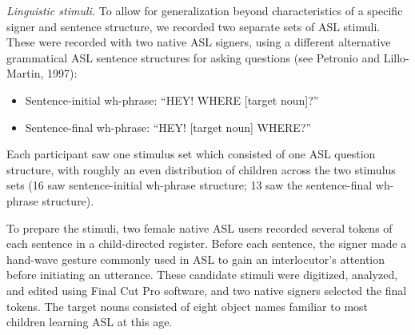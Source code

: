 \documentclass[oneside]{report}
\begin{document}
\emph{Linguistic stimuli.} To allow for generalization beyond
characteristics of a specific signer and sentence structure, we recorded
two separate sets of ASL stimuli. These were recorded with two native
ASL signers, using a different alternative grammatical ASL sentence
structures for asking questions (see Petronio and Lillo-Martin, 1997):
\begin{itemize}
\tightlist
\item
  Sentence-initial wh-phrase: ``HEY! WHERE {[}target noun{]}?''
\item
  Sentence-final wh-phrase: ``HEY! {[}target noun{]} WHERE?''
\end{itemize}
\noindent Each participant saw one stimulus set which consisted of one
ASL question structure, with roughly an even distribution of children
across the two stimulus sets (16 saw sentence-initial wh-phrase
structure; 13 saw the sentence-final wh-phrase structure).
\begin{table}

\caption[Iconicity scores and phonological overlap for ASL stimuli]{\label{tab:sol-asl-lex-table}Iconicity scores (1 = not iconic at all; 7 = very iconic) and degree of phonological overlap (out of 5 features) for each sign item-pair. Values were taken from ASL-LEX, a database of lexical and phonological properties of signs in ASL.}
\centering
{}
\end{table}
To prepare the stimuli, two female native ASL users recorded several
tokens of each sentence in a child-directed register. Before each
sentence, the signer made a hand-wave gesture commonly used in ASL to
gain an interlocutor's attention before initiating an utterance. These
candidate stimuli were digitized, analyzed, and edited using Final Cut
Pro software, and two native signers selected the final tokens. The
target nouns consisted of eight object names familiar to most children
learning ASL at this age.
\end{document}

